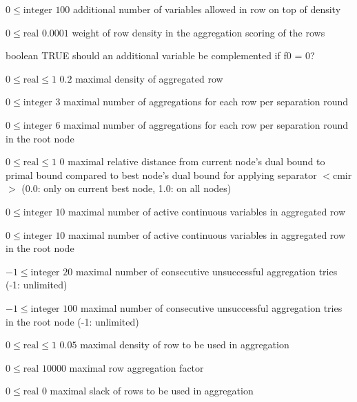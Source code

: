 %
{$0\leq\textrm{integer}$}%
{$100$}%
{additional number of variables allowed in row on top of density}%
{}

%
{$0\leq\textrm{real}$}%
{$0.0001$}%
{weight of row density in the aggregation scoring of the rows}%
{}

%
{boolean}%
{TRUE}%
{should an additional variable be complemented if f0 = 0?}%
{}

%
{$0\leq\textrm{real}\leq1$}%
{$0.2$}%
{maximal density of aggregated row}%
{}

%
{$0\leq\textrm{integer}$}%
{$3$}%
{maximal number of aggregations for each row per separation round}%
{}

%
{$0\leq\textrm{integer}$}%
{$6$}%
{maximal number of aggregations for each row per separation round in the root node}%
{}

%
{$0\leq\textrm{real}\leq1$}%
{$0$}%
{maximal relative distance from current node's dual bound to primal bound compared to best node's dual bound for applying separator $<$cmir$>$ (0.0: only on current best node, 1.0: on all nodes)}%
{}

%
{$0\leq\textrm{integer}$}%
{$10$}%
{maximal number of active continuous variables in aggregated row}%
{}

%
{$0\leq\textrm{integer}$}%
{$10$}%
{maximal number of active continuous variables in aggregated row in the root node}%
{}

%
{$-1\leq\textrm{integer}$}%
{$20$}%
{maximal number of consecutive unsuccessful aggregation tries (-1: unlimited)}%
{}

%
{$-1\leq\textrm{integer}$}%
{$100$}%
{maximal number of consecutive unsuccessful aggregation tries in the root node (-1: unlimited)}%
{}

%
{$0\leq\textrm{real}\leq1$}%
{$0.05$}%
{maximal density of row to be used in aggregation}%
{}

%
{$0\leq\textrm{real}$}%
{$10000$}%
{maximal row aggregation factor}%
{}

%
{$0\leq\textrm{real}$}%
{$0$}%
{maximal slack of rows to be used in aggregation}%
{}

